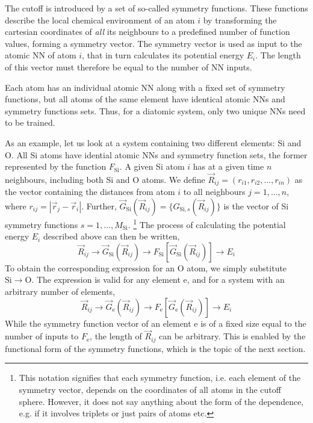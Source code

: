 \documentclass[twoside,english]{uiofysmaster}
\begin{document}
The cutoff is introduced by a set of so-called symmetry functions. 
These functions
describe the local chemical environment of an atom $i$ by transforming the cartesian coordinates of \textit{all} its neighbours to 
a predefined number of function values, forming a symmetry vector. 
The symmetry vector is used as input to the atomic NN of atom $i$, that in turn calculates its potential energy $E_i$.
The length of this vector must therefore be equal to the number of NN inputs. 

Each atom has an individual atomic NN along with a fixed set of symmetry functions, but
all atoms of the same element have identical 
atomic NNs and symmetry functions sets. Thus, for a diatomic system, only two unique NNs need to be trained. 

As an example, let us look at a system containing two different elements: Si and O. 
All Si atoms have idential atomic NNs and symmetry function sets, the former represented by the function $F_{\mathrm{Si}}$. 
A given Si atom $i$ has at a given time $n$ neighbours, including both Si and O atoms.  
We define $\vec{R}_{ij} = (r_{i1}, r_{i2}, \dots, r_{in})$ as the vector containing the distances from
atom $i$ to all neighbours $j = 1,\dots,n$, where $r_{ij} = |\vec{r}_j - \vec{r}_i|$. 
Further, $\vec{G}_\mathrm{Si}(\vec{R}_{ij}) = \{G_{\mathrm{Si},s}(\vec{R}_{ij})\}$ is the vector of Si symmetry functions
$s = 1,\dots,M_\mathrm{Si}$. \footnote{This notation signifies that each symmetry function, i.e. each element of 
the symmetry vector, depends on the coordinates of all atoms in the cutoff sphere. However, it does not say anything about
the form of the dependence, e.g. if it involves triplets or just pairs of atoms etc.}
The process of calculating the potential energy $E_i$ described above can then be written,
\begin{equation}
 \vec{R}_{ij} \rightarrow \vec{G}_\mathrm{Si}(\vec{R}_{ij}) \rightarrow F_\mathrm{Si}[\vec{G}_\mathrm{Si}(\vec{R}_{ij})] 
 \rightarrow E_i
 \label{BPatomicEnergySi}
\end{equation}
To obtain the corresponding expression for an O atom, we simply substitute $\mathrm{Si} \rightarrow \mathrm{O}$. 
The expression is valid for any element e, and for a system with an arbitrary number of elements,
\begin{equation}
  \vec{R}_{ij} \rightarrow \vec{G}_\mathrm{e}(\vec{R}_{ij}) \rightarrow F_\mathrm{e}[\vec{G}_\mathrm{e}(\vec{R}_{ij})] 
 \rightarrow E_i
 \label{BPatomicEnergy}
\end{equation}
While the symmetry function vector of an element e is of a fixed size equal to the number of inputs to $F_\mathrm{e}$,
the length of $\vec{R}_{ij}$ can be arbitrary. This is enabled by the functional form of the symmetry functions, 
which is the topic of the next section. 
\end{document}
